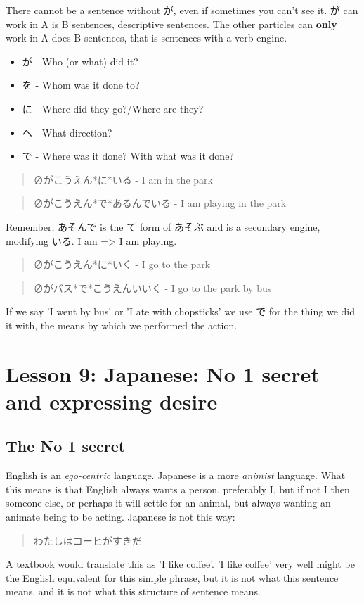 \documentclass[11pt]{article}
\begin{document}
There cannot be a sentence without が, even if sometimes you can't see it. が can work in A is B sentences, descriptive sentences. The other particles can \textbf{only} work in A does B sentences, that is sentences with a verb engine.
\begin{itemize}
\item が - Who (or what) did it?
\item を - Whom was it done to?
\item に - Where did they go?/Where are they?
\item へ - What direction?
\item で - Where was it done? With what was it done?
\end{itemize}
\begin{quote}
∅がこうえん*に*いる - I am in the park
\end{quote}
\begin{quote}
∅がこうえん*で*あるんでいる - I am playing in the park
\end{quote}
Remember, あそんで is the て form of あそぶ and is a secondary engine, modifying いる. I am => I am playing.
\begin{quote}
∅がこうえん*に*いく - I go to the park
\end{quote}
\begin{quote}
∅がバス*で*こうえんいいく - I go to the park by bus
\end{quote}
If we say 'I went by bus' or 'I ate with chopsticks' we use で for the thing we did it with, the means by which we performed the action.
\section{Lesson 9: Japanese: No 1 secret and expressing desire}
\label{sec:org468d074}
\subsection{The No 1 secret}
\label{sec:org39ceeb5}
English is an \emph{ego-centric} language. Japanese is a more \emph{animist} language. What this means is that English always wants a person, preferably I, but if not I then someone else, or perhaps it will settle for an animal, but always wanting an animate being to be acting. Japanese is not this way:
\begin{quote}
わたしはコーヒがすきだ
\end{quote}
A textbook would translate this as 'I like coffee'. 'I like coffee' very well might be the English equivalent for this simple phrase, but it is not what this sentence means, and it is not what this structure of sentence means.
\end{document}
